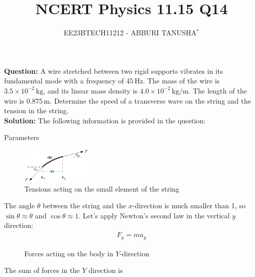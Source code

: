 \documentclass[journal,12pt,twocolumn]{IEEEtran}
\title{
	
\title{NCERT Physics 11.15 Q14}
\author{EE23BTECH11212 - ABBURI TANUSHA$^{*}$%
}


}
\theoremstyle{remark}
\begin{document}
\maketitle

\textbf{Question:} 
A wire stretched between two rigid supports vibrates in its fundamental mode with a frequency of $45 \, \text{Hz}$. The mass of the wire is $3.5 \times 10^{-2} \, \text{kg}$, and its linear mass density is $4.0 \times 10^{-2} \, \text{kg/m}$. The length of the wire is $0.875 \, \text{m}$. Determine the speed of a transverse wave on the string and the tension in the string.
\\

     
\textbf{Solution: }
The following information is provided in the question:

 \begin{table}[h]
 	\centering
 	\resizebox{6 cm}{!}{
 		
 	}
 	\vspace{6 pt}
 	\caption{Parameters}
 	\label{tab:my_label} 
 \end{table}
 

\begin{figure}[htb]
  \centering
  \includegraphics[width=0.3\textwidth]{figs/fig2.png} 
  \caption{Tensions acting on the small element of the string}
  \label{fig:1}
\end{figure}




 
The angle $\theta$ between the string and the $x$-direction is much smaller than 1, so $\sin \theta \approx \theta$ and $\cos \theta \approx 1$.
Let's apply Newton's second law in the vertical $y$ direction:
\begin{align}
F_y = ma_y
\end{align}

\begin{figure}[htb]
	\centering
	
	\caption{Forces acting on the body in $Y$-direction}
	\label{fig:2}
\end{figure}

The sum of forces in the $Y$ direction is
\end{document}
